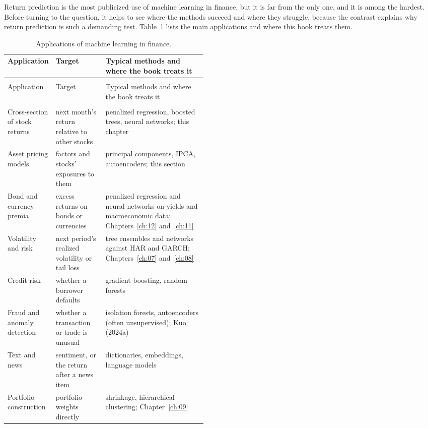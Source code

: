 Return prediction is the most publicized use of machine learning in finance, but it is far from the only one, and it is among the hardest. Before turning to the question, it helps to see where the methods succeed and where they struggle, because the contrast explains why return prediction is such a demanding test. Table~\ref{tab:20-applications} lists the main applications and where this book treats them.

\begingroup
\small
\setlength{\LTpre}{6pt}\setlength{\LTpost}{6pt}
\begin{longtable}{@{}>{\raggedright\arraybackslash}p{0.21\linewidth}>{\raggedright\arraybackslash}p{0.25\linewidth}>{\raggedright\arraybackslash}p{}@{}}
\caption{Applications of machine learning in finance.}
\label{tab:20-applications} \\
\toprule
Application & Target & Typical methods and where the book treats it \\
\midrule
\endfirsthead
\multicolumn{3}{@{}l}{\emph{(continued)}} \\
\toprule
Application & Target & Typical methods and where the book treats it \\
\midrule
\endhead
\midrule
\multicolumn{3}{r@{}}{\emph{(continued on the next page)}} \\
\endfoot
\bottomrule
\endlastfoot
Cross-section of stock returns & next month's return relative to other stocks & penalized regression, boosted trees, neural networks; this chapter \\*
Asset pricing models & factors and stocks' exposures to them & principal components, IPCA, autoencoders; this section \\
Bond and currency premia & excess returns on bonds or currencies & penalized regression and neural networks on yields and macroeconomic data; Chapters~\ref{ch:12} and~\ref{ch:11} \\
Volatility and risk & next period's realized volatility or tail loss & tree ensembles and networks against HAR and GARCH; Chapters~\ref{ch:07} and~\ref{ch:08} \\
Credit risk & whether a borrower defaults & gradient boosting, random forests \\
Fraud and anomaly detection & whether a transaction or trade is unusual & isolation forests, autoencoders (often unsupervised); Kuo (2024a) \\
Text and news & sentiment, or the return after a news item & dictionaries, embeddings, language models \\*
Portfolio construction & portfolio weights directly & shrinkage, hierarchical clustering; Chapter~\ref{ch:09} \\
\end{longtable}
\endgroup

